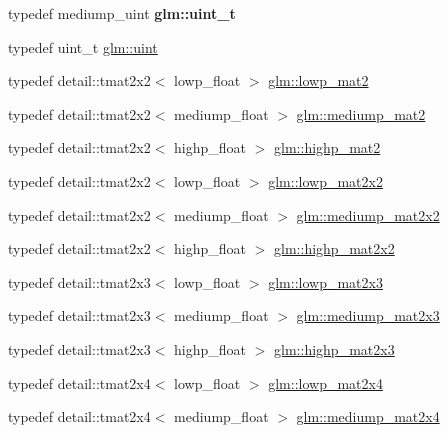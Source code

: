 \begin{DoxyCompactItemize}
\item 
\hypertarget{group__core__precision_ga5f2ae871c284c9d39ae8fdbb1305b566}{}typedef mediump\+\_\+uint {\bfseries glm\+::uint\+\_\+t}\label{group__core__precision_ga5f2ae871c284c9d39ae8fdbb1305b566}

\item 
typedef uint\+\_\+t \hyperlink{group__core__precision_ga483f6011e60602f0b73bfd0acad0f04c}{glm\+::uint}
\item 
typedef detail\+::tmat2x2$<$ lowp\+\_\+float $>$ \hyperlink{group__core__precision_ga403348153f5cd7bd52598be409afdf47}{glm\+::lowp\+\_\+mat2}
\item 
typedef detail\+::tmat2x2$<$ mediump\+\_\+float $>$ \hyperlink{group__core__precision_gae67a4f24fb96b68e0f0346ef4212db61}{glm\+::mediump\+\_\+mat2}
\item 
typedef detail\+::tmat2x2$<$ highp\+\_\+float $>$ \hyperlink{group__core__precision_ga6652bb577f74f322220305a985a8c200}{glm\+::highp\+\_\+mat2}
\item 
typedef detail\+::tmat2x2$<$ lowp\+\_\+float $>$ \hyperlink{group__core__precision_gae3f6c672d0fa47ece879f2b1cda7f22b}{glm\+::lowp\+\_\+mat2x2}
\item 
typedef detail\+::tmat2x2$<$ mediump\+\_\+float $>$ \hyperlink{group__core__precision_gaa78fd2384931c244700851141b8a47eb}{glm\+::mediump\+\_\+mat2x2}
\item 
typedef detail\+::tmat2x2$<$ highp\+\_\+float $>$ \hyperlink{group__core__precision_gadc6208de252d8c5d4afd1a3518370db3}{glm\+::highp\+\_\+mat2x2}
\item 
typedef detail\+::tmat2x3$<$ lowp\+\_\+float $>$ \hyperlink{group__core__precision_ga094f5266f214da7ef32e49df6432f4fa}{glm\+::lowp\+\_\+mat2x3}
\item 
typedef detail\+::tmat2x3$<$ mediump\+\_\+float $>$ \hyperlink{group__core__precision_gac44c7deb23abed76330948e10d919bcc}{glm\+::mediump\+\_\+mat2x3}
\item 
typedef detail\+::tmat2x3$<$ highp\+\_\+float $>$ \hyperlink{group__core__precision_ga89136b699656886b0941c95cf2778da3}{glm\+::highp\+\_\+mat2x3}
\item 
typedef detail\+::tmat2x4$<$ lowp\+\_\+float $>$ \hyperlink{group__core__precision_ga800238e68eee3279c7a38d4f3cd005e8}{glm\+::lowp\+\_\+mat2x4}
\item 
typedef detail\+::tmat2x4$<$ mediump\+\_\+float $>$ \hyperlink{group__core__precision_ga2e80caa3f70e504bd574664b1029e627}{glm\+::mediump\+\_\+mat2x4}
\item 

\end{DoxyCompactItemize}
